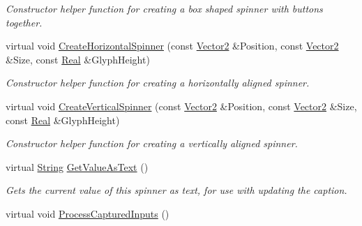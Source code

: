 \begin{DoxyCompactItemize}
\begin{DoxyCompactList}\small\item\em Constructor helper function for creating a box shaped spinner with buttons together. \item\end{DoxyCompactList}\item 
\hypertarget{classMezzanine_1_1UI_1_1Spinner_a1edb85ce3af53d11a167400b647038f4}{
virtual void \hyperlink{classMezzanine_1_1UI_1_1Spinner_a1edb85ce3af53d11a167400b647038f4}{CreateHorizontalSpinner} (const \hyperlink{classMezzanine_1_1Vector2}{Vector2} \&Position, const \hyperlink{classMezzanine_1_1Vector2}{Vector2} \&Size, const \hyperlink{namespaceMezzanine_a726731b1a7df72bf3583e4a97282c6f6}{Real} \&GlyphHeight)}
\label{classMezzanine_1_1UI_1_1Spinner_a1edb85ce3af53d11a167400b647038f4}

\begin{DoxyCompactList}\small\item\em Constructor helper function for creating a horizontally aligned spinner. \item\end{DoxyCompactList}\item 
\hypertarget{classMezzanine_1_1UI_1_1Spinner_a3526ec5831adf07e2dab6a2404837e36}{
virtual void \hyperlink{classMezzanine_1_1UI_1_1Spinner_a3526ec5831adf07e2dab6a2404837e36}{CreateVerticalSpinner} (const \hyperlink{classMezzanine_1_1Vector2}{Vector2} \&Position, const \hyperlink{classMezzanine_1_1Vector2}{Vector2} \&Size, const \hyperlink{namespaceMezzanine_a726731b1a7df72bf3583e4a97282c6f6}{Real} \&GlyphHeight)}
\label{classMezzanine_1_1UI_1_1Spinner_a3526ec5831adf07e2dab6a2404837e36}

\begin{DoxyCompactList}\small\item\em Constructor helper function for creating a vertically aligned spinner. \item\end{DoxyCompactList}\item 
\hypertarget{classMezzanine_1_1UI_1_1Spinner_afc04f7b06ac0469cfc1731366f3d1c39}{
virtual \hyperlink{namespaceMezzanine_acf9fcc130e6ebf08e3d8491aebcf1c86}{String} \hyperlink{classMezzanine_1_1UI_1_1Spinner_afc04f7b06ac0469cfc1731366f3d1c39}{GetValueAsText} ()}
\label{classMezzanine_1_1UI_1_1Spinner_afc04f7b06ac0469cfc1731366f3d1c39}

\begin{DoxyCompactList}\small\item\em Gets the current value of this spinner as text, for use with updating the caption. \item\end{DoxyCompactList}\item 
\hypertarget{classMezzanine_1_1UI_1_1Spinner_afaca70dd0afaa63ae5936f7437af6632}{
virtual void \hyperlink{classMezzanine_1_1UI_1_1Spinner_afaca70dd0afaa63ae5936f7437af6632}{ProcessCapturedInputs} ()}
\label{classMezzanine_1_1UI_1_1Spinner_afaca70dd0afaa63ae5936f7437af6632}


\end{DoxyCompactItemize}
